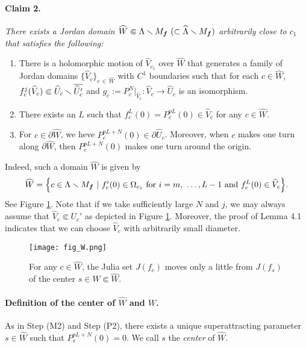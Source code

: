 \medskip

\medskip

\paragraph{\bf Claim 2.}
{\it
There exists 
a Jordan domain $\widehat{W} \Subset \Lambda \smallsetminus M_{\boldsymbol{f}}
~(\subset \widehat{\Lambda} \smallsetminus M_{\boldsymbol{f}})$ 
arbitrarily close to $c_1$ that satisfies the following:
\begin{enumerate}[\rm (1)]
\item
There is a holomorphic motion of $\widehat{V}_{c_1}$
over $\widehat{W}$ that generates 
a family of Jordan domains $\{\widehat{V}_{c}\}_{c \,\in \, \widehat{W}}$
with $C^1$ boundaries
such that for each $c \in \widehat{W}$, 
${f_c^j(\widehat{V}_{c} )} \Subset \widehat{U}_{c} \smallsetminus \overline{\widehat{U}_{c}'}$
and 
$g_c:=P_{c}^{N}|_{\widehat{V}_{c}}:\widehat{V}_{c} \to \widehat{U}_{c}$
is an isomorphism.
\item
There exists an $L$ such that 
$f_{c}^{L}(0)=P_{c}^{pL}(0) \in \widehat{V}_{c}$ for any $c \in \widehat{W}$.
\item 
For $c \in \partial \widehat{W}$, 
we heve $P_{c}^{pL+N}(0) \in \partial  \widehat{U}_c$.
Moreover, when $c$ makes one turn along $\partial \widehat{W}$,
then $P_{c}^{pL+N}(0)$ makes one turn around the origin.
\end{enumerate}
}
Indeed, such a domain $\widehat{W}$ is given by
$$
\widehat{W}
=
{\left\{ c \in \Lambda \smallsetminus M_{\boldsymbol{f}} 
\ | \  
f_c^{i}(0) \in \Omega_{c_1}~\text{for $i=m,\,  \,\ldots, L-1$ and}~ 
f_c^L(0) \in \widehat{V}_{c} \right\}}.
$$
See Figure \ref{fig_W}. Note that if we take sufficiently large 
$N$ and $j$, we may always assume that 
$\widehat{V}_c \Subset U_c'$ as depicted in Figure \ref{fig_W}.
Moreover, the proof of Lemma 4.1 indicates that
we can choose $\widehat{V}_c$ with arbitrarily small diameter.

\begin{figure}[htbp]
\begin{center}
\texttt{[image: fig\_W.png]}
\caption{\small
For any $c \in \widehat{W}$,
the Julia set $J(f_c)$ moves only a little from 
$J(f_s)$ of the center $s \in W \Subset \widehat{W}$.
}\label{fig_W}
\end{center}
\end{figure}


\medskip

\paragraph{\bf Definition of the center of $\widehat{W}$ and $W$.}
As in Step (M2) and Step (P2), 
there exists a unique 
superattracting parameter $s \in \widehat{W}$ 
such that $P_{s}^{pL+N}(0)=0$.
We call $s$ the {\it center} of $\widehat{W}$.

